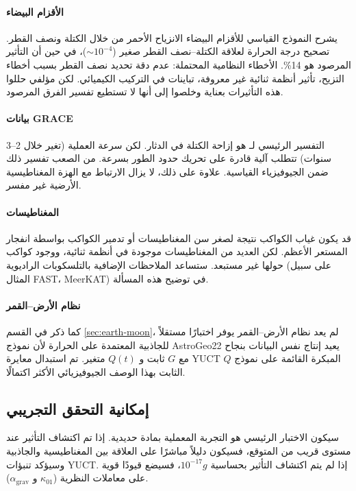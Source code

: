\documentclass[11pt,a4paper]{article}
\begin{document}
	\paragraph{الأقزام البيضاء}
	يشرح النموذج القياسي للأقزام البيضاء الانزياح الأحمر من خلال الكتلة ونصف القطر. تصحيح درجة الحرارة لعلاقة الكتلة–نصف القطر صغير ($\sim 10^{-4}$)، في حين أن التأثير المرصود هو 14\%. الأخطاء النظامية المحتملة: عدم دقة تحديد نصف القطر بسبب أخطاء التزيح، تأثير أنظمة ثنائية غير معروفة، تباينات في التركيب الكيميائي. لكن مؤلفي \cite{Crumpler2024} حللوا هذه التأثيرات بعناية وخلصوا إلى أنها لا تستطيع تفسير الفرق المرصود.
	
	\paragraph{بيانات GRACE}
	التفسير الرئيسي لـ \cite{Rosat2025} هو إزاحة الكتلة في الدثار. لكن سرعة العملية (تغير خلال 2–3 سنوات) تتطلب آلية قادرة على تحريك حدود الطور بسرعة. من الصعب تفسير ذلك ضمن الجيوفيزياء القياسية. علاوة على ذلك، لا يزال الارتباط مع الهزة المغناطيسية الأرضية غير مفسر.
	
	\paragraph{المغناطيسات}
	قد يكون غياب الكواكب نتيجة لصغر سن المغناطيسات أو تدمير الكواكب بواسطة انفجار المستعر الأعظم. لكن العديد من المغناطيسات موجودة في أنظمة ثنائية، ووجود كواكب حولها غير مستبعد. ستساعد الملاحظات الإضافية بالتلسكوبات الراديوية (على سبيل المثال FAST، MeerKAT) في توضيح هذه المسألة.
	
	\paragraph{نظام الأرض–القمر}
	كما ذكر في القسم \ref{sec:earth-moon}، لم يعد نظام الأرض–القمر يوفر اختبارًا مستقلاً للجاذبية المعتمدة على الحرارة لأن نموذج AstroGeo22 يعيد إنتاج نفس البيانات بنجاح مع $G$ ثابت و $Q(t)$ متغير. تم استبدال معايرة YUCT المبكرة القائمة على نموذج $Q$ الثابت بهذا الوصف الجيوفيزيائي الأكثر اكتمالًا.
	
	\subsection{إمكانية التحقق التجريبي}
	\label{subsec:discussion-experiment}
	
	سيكون الاختبار الرئيسي هو التجربة المعملية بمادة حديدية. إذا تم اكتشاف التأثير عند مستوى قريب من المتوقع، فسيكون دليلاً مباشرًا على العلاقة بين المغناطيسية والجاذبية وسيؤكد تنبؤات YUCT. إذا لم يتم اكتشاف التأثير بحساسية $10^{-17}g$، فسيضع قيودًا قوية على معاملات النظرية ($\kappa_{01}$ و $\alpha_{\text{grav}}$).
	
\end{document}
